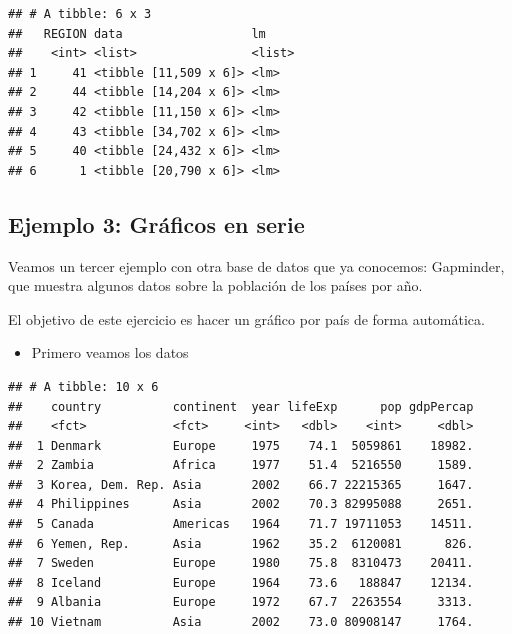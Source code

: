 \documentclass[]{book}
\newenvironment{Shaded}{\begin{snugshade}}{\end{snugshade}}
\newcommand{\DecValTok}[1]{\textcolor[rgb]{0.00,0.00,0.81}{#1}}
\newcommand{\KeywordTok}[1]{\textcolor[rgb]{0.13,0.29,0.53}{\textbf{#1}}}
\newcommand{\NormalTok}[1]{#1}
\newcommand{\OperatorTok}[1]{\textcolor[rgb]{0.81,0.36,0.00}{\textbf{#1}}}
\newcommand{\StringTok}[1]{\textcolor[rgb]{0.31,0.60,0.02}{#1}}
\providecommand{\tightlist}{%
  \setlength{\itemsep}{0pt}\setlength{\parskip}{0pt}}
\begin{document}
\begin{verbatim}
## # A tibble: 6 x 3
##   REGION data                  lm    
##    <int> <list>                <list>
## 1     41 <tibble [11,509 x 6]> <lm>  
## 2     44 <tibble [14,204 x 6]> <lm>  
## 3     42 <tibble [11,150 x 6]> <lm>  
## 4     43 <tibble [34,702 x 6]> <lm>  
## 5     40 <tibble [24,432 x 6]> <lm>  
## 6      1 <tibble [20,790 x 6]> <lm>
\end{verbatim}

\hypertarget{ejemplo-3-graficos-en-serie}{%
\subsection{Ejemplo 3: Gráficos en serie}\label{ejemplo-3-graficos-en-serie}}

Veamos un tercer ejemplo con otra base de datos que ya conocemos: Gapminder, que muestra algunos datos sobre la población de los países por año.

El objetivo de este ejercicio es hacer un gráfico por país de forma automática.

\begin{itemize}
\tightlist
\item
  Primero veamos los datos
\end{itemize}

\begin{Shaded}
\end{Shaded}

\begin{verbatim}
## # A tibble: 10 x 6
##    country          continent  year lifeExp      pop gdpPercap
##    <fct>            <fct>     <int>   <dbl>    <int>     <dbl>
##  1 Denmark          Europe     1975    74.1  5059861    18982.
##  2 Zambia           Africa     1977    51.4  5216550     1589.
##  3 Korea, Dem. Rep. Asia       2002    66.7 22215365     1647.
##  4 Philippines      Asia       2002    70.3 82995088     2651.
##  5 Canada           Americas   1964    71.7 19711053    14511.
##  6 Yemen, Rep.      Asia       1962    35.2  6120081      826.
##  7 Sweden           Europe     1980    75.8  8310473    20411.
##  8 Iceland          Europe     1964    73.6   188847    12134.
##  9 Albania          Europe     1972    67.7  2263554     3313.
## 10 Vietnam          Asia       2002    73.0 80908147     1764.
\end{verbatim}
\end{document}
